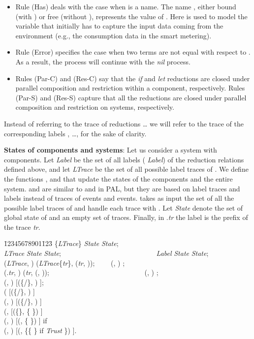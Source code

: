 \documentclass{llncs}
\begin{document}
\begin{itemize}
\item 
Rule (Has) deals with the case when  is a name. 
The name , either bound (with ) or free (without ), represents the value of . Here 
 is used to model the variable that  initially has to capture the input data 
coming from the environment (e.g., the consumption data in the smart metering).    

\item 
Rule (Error) specifies the case when two terms are not equal with respect to . As a result, 
the process will continue with the \textit{nil} process. 

\item 
Rules (Par-C) and (Res-C) say that the \textit{if} and \textit{let} reductions are 
closed under parallel composition and restriction within a component, respectively.   
Rules (Par-S) and (Res-S) capture that all the reductions are 
closed under parallel composition and restriction on systems, respectively.

\end{itemize}

Instead of referring to the trace of reductions  \dots 
 we will refer to the trace of the corresponding labels 
, \dots,  for the sake of clarity.         
 
\textbf{States of components and systems}: Let us consider a system  with  components. 
Let \textit{Label} be the set of all labels (   \textit{Label}) of the reduction 
relations defined above, and let \textit{LTrace} be the set of all possible label traces of . 
We define the functions ,  and  
that update the states of the components and the entire system.  and 
 are similar to  and  in PAL, but they are based 
on label traces and labels instead of traces of events and events.  takes 
as input the set of all the possible label traces of  and handle each trace with .
Let \textit{State} denote the 
set of global state of  and  an empty set of traces. Finally, in 
.\textit{tr} the label  is the prefix of the trace \textit{tr}.

\small
\begin{tabbing}
    \=12345678901\=123\= \kill
    \>   \{\textit{LTrace}\}  \textit{State}  \textit{State};\\
    \>   \textit{LTrace}  \textit{State}  \textit{State}; \ \ \ \ \ \ \    \ \ \ \ \ \ \  \ \ \ \ \ \ \  \ \ \ \ \ \   \textit{Label}  \textit{State}  \textit{State};\\ 
    \> (\textit{LTrace}, )    (\textit{LTrace}\{\textit{tr}\}, 
    (\textit{tr}, )); \ \ \ \  
    (, )   ;\\  
    \> (.\textit{tr}, )   (\textit{tr}, (, )); \ \ \ \ \ \ \ \ \ \ \ \ \ \ \ \ \ \ \ \ \ \ \ \ \ \ \  (, )  ;\\
    \> (, )  [(\{/\}, )  ];\\
    \> (  [(\{/\}, )  ]\\
    \> (, )  [(\{/\}, )  ]\\
    \> (,    [(\{\},   \{  \})  ]\\ 
    \> (, )  [(,   \{  \})  ] 
     if     \\
\> (, )  [(,   \{\{  \} if  \textit{Trust}   \})  ].
\end{tabbing}
\normalsize
\end{document}
